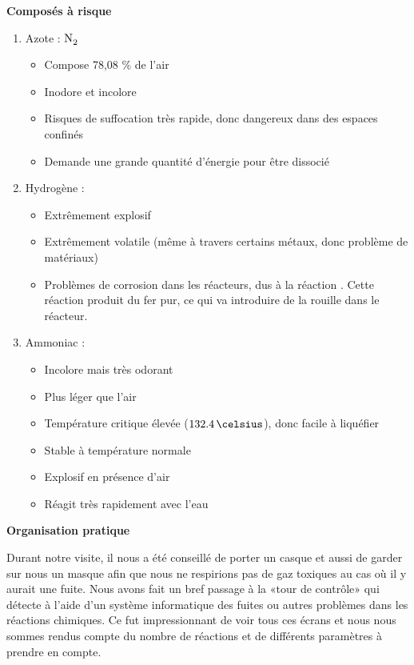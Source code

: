 \textbf{Composés à risque}
\begin{enumerate}
\item Azote : $\ce{N2}$
\begin{itemize}
\item Compose 78,08 \% de l'air
\item Inodore et incolore 
\item Risques de suffocation très rapide, donc dangereux dans des espaces confinés
\item Demande une grande quantité d'énergie pour être dissocié
\end{itemize}
\item Hydrogène : 
\begin{itemize}
\item Extrêmement explosif
\item Extrêmement volatile (même à travers certains métaux, donc problème de matériaux)
\item Problèmes de corrosion dans les réacteurs, dus à la réaction
.
Cette réaction produit du fer pur, ce qui va introduire de la rouille dans le réacteur.
\end{itemize}

\item Ammoniac : 
\begin{itemize}
\item Incolore mais très odorant
\item Plus léger que l'air
\item Température critique élevée ($132.4\,\celsius$), donc facile à liquéfier
\item Stable à température normale
\item Explosif en présence d'air
\item Réagit très rapidement avec l'eau
\end{itemize}
\end{enumerate}

\textbf{Organisation pratique}

Durant notre visite, il nous a été conseillé de porter un casque et aussi de garder sur nous un masque afin que nous ne respirions pas de gaz toxiques au cas où il y aurait une fuite. Nous avons fait un bref passage à la «tour de contrôle» qui détecte à l'aide d'un système informatique des fuites ou autres problèmes dans les réactions chimiques. Ce fut impressionnant de voir tous ces écrans et nous nous sommes rendus compte du nombre de réactions et de différents paramètres à prendre en compte.

